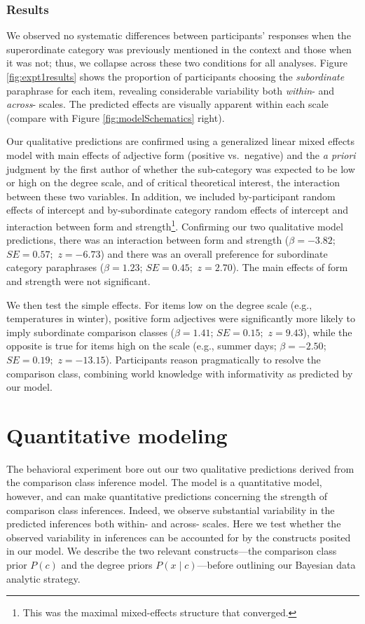 \documentclass[doc]{apa6}
\begin{document}
\subsubsection{Results}

We observed no systematic differences between participants' responses
when the superordinate category was previously mentioned in the context
and those when it was not; thus, we collapse across these two conditions
for all analyses. Figure \ref{fig:expt1results} shows the proportion of
participants choosing the \emph{subordinate} paraphrase for each item,
revealing considerable variability both \emph{within}- and
\emph{across}- scales. The predicted effects are visually apparent
within each scale (compare with Figure \ref{fig:modelSchematics} right).

Our qualitative predictions are confirmed using a generalized linear
mixed effects model with main effects of adjective form (positive
vs.~negative) and the \emph{a priori} judgment by the first author of
whether the sub-category was expected to be low or high on the degree
scale, and of critical theoretical interest, the interaction between
these two variables. In addition, we included by-participant random
effects of intercept and by-subordinate category random effects of
intercept and interaction between form and strength\footnote{This was
  the maximal mixed-effects structure that converged.}. Confirming our
two qualitative model predictions, there was an interaction between form
and strength (\(\beta = -3.82\); \(SE = 0.57;\) \(z = -6.73\)) and there
was an overall preference for subordinate category paraphrases
(\(\beta = 1.23\); \(SE = 0.45;\) \(z = 2.70\)). The main effects of
form and strength were not significant.

We then test the simple effects. For items low on the degree scale
(e.g., temperatures in winter), positive form adjectives were
significantly more likely to imply subordinate comparison classes
(\(\beta = 1.41\); \(SE = 0.15;\) \(z = 9.43\)), while the opposite is
true for items high on the scale (e.g., summer days; \(\beta = -2.50\);
\(SE = 0.19;\) \(z = -13.15\)). Participants reason pragmatically to
resolve the comparison class, combining world knowledge with
informativity as predicted by our model.


\section{Quantitative modeling}

The behavioral experiment bore out our two qualitative predictions
derived from the comparison class inference model. The model is a
quantitative model, however, and can make quantitative predictions
concerning the strength of comparison class inferences. Indeed, we
observe substantial variability in the predicted inferences both within-
and across- scales. Here we test whether the observed variability in
inferences can be accounted for by the constructs posited in our model.
We describe the two relevant constructs---the comparison class prior
\(P(c)\) and the degree priors \(P(x \mid c)\)---before outlining our
Bayesian data analytic strategy.
\end{document}
